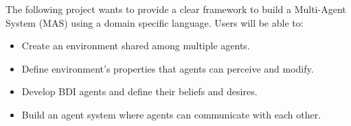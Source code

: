 \documentclass{scrartcl}
\begin{document}
The following project wants to provide a clear framework to build a Multi-Agent System (MAS) using a domain specific language.
Users will be able to:
\begin{itemize}
    \item Create an environment shared among multiple agents.
    \item Define environment's properties that agents can perceive and modify.
    \item Develop BDI agents and define their beliefs and desires.
    \item Build an agent system where agents can communicate with each other.
\end{itemize}

%
%
\end{document}

